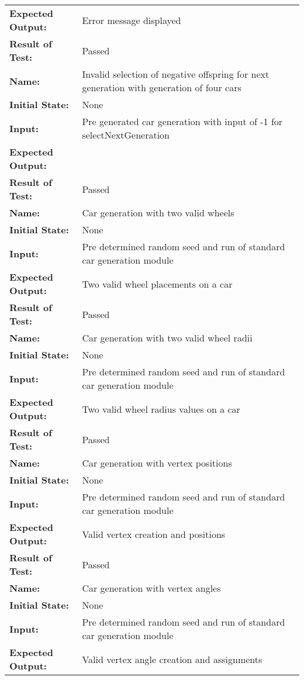 \documentclass[12pt, titlepage]{article}
\begin{document}
\begin{center}
\begin{longtable}{ l | p{10cm} }
\textbf{Expected Output:} & Error message displayed\\[0.6em]
\textbf{Result of Test:} & Passed\\
\hline
\rule{0pt}{1.5em}\textbf{Name:} & Invalid selection of negative offspring for next generation with generation of four cars\\
\textbf{Initial State:} & None\\
\textbf{Input:} & Pre generated car generation with input of -1 for selectNextGeneration\\
\textbf{Expected Output:} & \\[0.6em]
\textbf{Result of Test:} & Passed\\
\hline
\rule{0pt}{1.5em}\textbf{Name:} & Car generation with two valid wheels\\
\textbf{Initial State:} & None\\
\textbf{Input:} & Pre determined random seed and run of standard car generation module\\
\textbf{Expected Output:} & Two valid wheel placements on a car\\[0.6em]
\textbf{Result of Test:} & Passed\\
\hline
\rule{0pt}{1.5em}\textbf{Name:} & Car generation with two valid wheel radii\\
\textbf{Initial State:} & None\\
\textbf{Input:} & Pre determined random seed and run of standard car generation module\\
\textbf{Expected Output:} & Two valid wheel radius values on a car\\[0.6em]
\textbf{Result of Test:} & Passed\\
\hline
\rule{0pt}{1.5em}\textbf{Name:} & Car generation with vertex positions\\
\textbf{Initial State:} & None\\
\textbf{Input:} & Pre determined random seed and run of standard car generation module\\
\textbf{Expected Output:} & Valid vertex creation and positions\\[0.6em]
\textbf{Result of Test:} & Passed\\
\hline
\rule{0pt}{1.5em}\textbf{Name:} & Car generation with vertex angles\\
\textbf{Initial State:} & None\\
\textbf{Input:} & Pre determined random seed and run of standard car generation module\\
\textbf{Expected Output:} & Valid vertex angle creation and assignments\\[0.6em]

\end{longtable}
\end{center}
\end{document}
